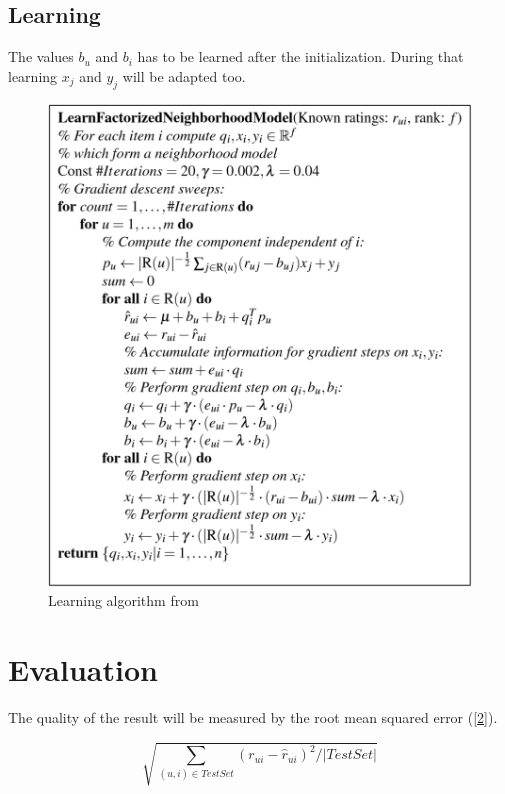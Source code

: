 \documentclass[pdftex,a4paper,11pt]{article}
\begin{document}
\subsection{Learning}

The values $b_u$ and $b_i$ has to be learned after the initialization. During that learning $x_j$ and $y_j$ will be adapted too.
\begin{figure}[H]
	\includegraphics[width=1\textwidth]{Algorithm.png}
	\caption{Learning algorithm from \cite{1}}
	\label{fig:LearningAlg}
\end{figure}


\section{Evaluation}

The quality of the result will be measured by the root mean squared error (\ref{2}).
 
\begin{equation} \label{2} \sqrt{ \sum_{(u,i) \in TestSet} (r_{u i} - \hat{r}_{u i} ) ^2 / \left| TestSet \right| } \end{equation}
\end{document}
